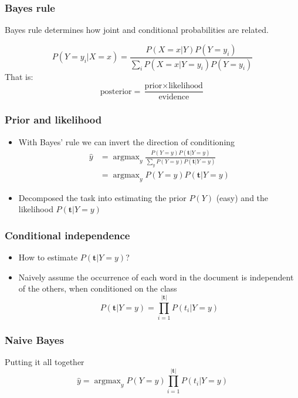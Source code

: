\documentclass[14pt,mathserif,dvipsnames,usenames]{beamer}
\DeclareMathOperator*{\argmax}{argmax}
\begin{document}
\begin{frame}
  \frametitle{Bayes rule} Bayes rule determines how joint and
  conditional probabilities are related.
 
  \begin{block}{}
\[
P(Y=y_i|X=x) = \frac{P(X=x|Y) P(Y=y_i)}{\sum_i P(X=x|Y=y_i)
  P(Y=y_i)}
\]
That is:
\[
\mbox{posterior} = \frac{\mbox{prior} \times
  \mbox{likelihood}}{\mbox{evidence}}
\]
\end{block}
\end{frame}

\begin{frame}
  \frametitle{Prior and likelihood}
  \begin{itemize}
  \item With Bayes' rule we can invert the direction of conditioning
\begin{align}\nonumber
\hat{y} & = \argmax_y \frac{P(Y=y)P(\mathbf{t}|Y=y)}{\sum_y P(Y=y)P(\mathbf{t}|Y=y) }\\\nonumber
        & = \argmax_y P(Y=y)P(\mathbf{t}|Y=y)
\end{align}
\item Decomposed the task into estimating the prior $P(Y)$ (easy) and
  the likelihood $P(\mathbf{t}|Y=y)$
  \end{itemize}
\end{frame}


\begin{frame}
  \frametitle{Conditional independence}
  \begin{itemize}
  \item How to estimate $P(\mathbf{t}|Y=y)$?
  \item \alert{Naively} assume the occurrence of each word in the
    document is independent of the others, when conditioned on the
    class
    \[
    P(\mathbf{t}|Y=y) = \prod_{i=1}^{|\mathbf{t}|} P(t_i|Y=y)
    \]
  \end{itemize}
\end{frame}



\begin{frame}\frametitle{Naive Bayes}
  \begin{block}{Putting it all together}
    \[
   \hat{y} = \argmax_y P(Y=y)\prod_{i=1}^{|\mathbf{t}|} P(t_i|Y=y)
    \]
\end{block}
\end{frame}
\end{document}

